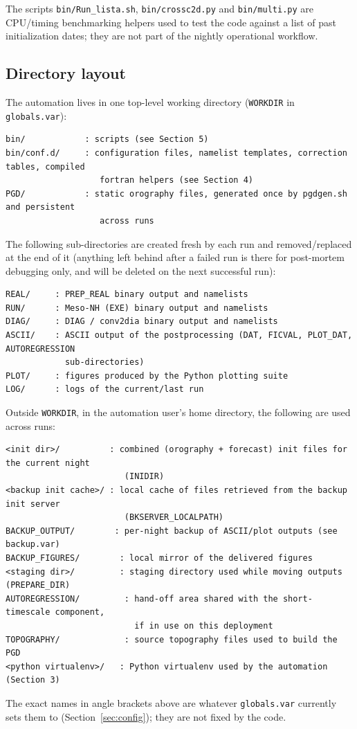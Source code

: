 The scripts \texttt{bin/Run\_lista.sh}, \texttt{bin/crossc2d.py} and \texttt{bin/multi.py} are
CPU/timing benchmarking helpers used to test the code against a list of past initialization dates; they
are not part of the nightly operational workflow.

\subsection{Directory layout}
The automation lives in one top-level working directory (\texttt{WORKDIR} in \texttt{globals.var}):
\begin{lstlisting}
bin/            : scripts (see Section 5)
bin/conf.d/     : configuration files, namelist templates, correction tables, compiled
                   fortran helpers (see Section 4)
PGD/            : static orography files, generated once by pgdgen.sh and persistent
                   across runs
\end{lstlisting}
The following sub-directories are created fresh by each run and removed/replaced at the end of it
(anything left behind after a failed run is there for post-mortem debugging only, and will be deleted
on the next successful run):
\begin{lstlisting}
REAL/     : PREP_REAL binary output and namelists
RUN/      : Meso-NH (EXE) binary output and namelists
DIAG/     : DIAG / conv2dia binary output and namelists
ASCII/    : ASCII output of the postprocessing (DAT, FICVAL, PLOT_DAT, AUTOREGRESSION
            sub-directories)
PLOT/     : figures produced by the Python plotting suite
LOG/      : logs of the current/last run
\end{lstlisting}
Outside \texttt{WORKDIR}, in the automation user's home directory, the following are used across runs:
\begin{lstlisting}
<init dir>/          : combined (orography + forecast) init files for the current night
                        (INIDIR)
<backup init cache>/ : local cache of files retrieved from the backup init server
                        (BKSERVER_LOCALPATH)
BACKUP_OUTPUT/        : per-night backup of ASCII/plot outputs (see backup.var)
BACKUP_FIGURES/        : local mirror of the delivered figures
<staging dir>/         : staging directory used while moving outputs (PREPARE_DIR)
AUTOREGRESSION/         : hand-off area shared with the short-timescale component,
                          if in use on this deployment
TOPOGRAPHY/             : source topography files used to build the PGD
<python virtualenv>/   : Python virtualenv used by the automation (Section 3)
\end{lstlisting}
The exact names in angle brackets above are whatever \texttt{globals.var} currently sets them to
(Section~\ref{sec:config}); they are not fixed by the code.

